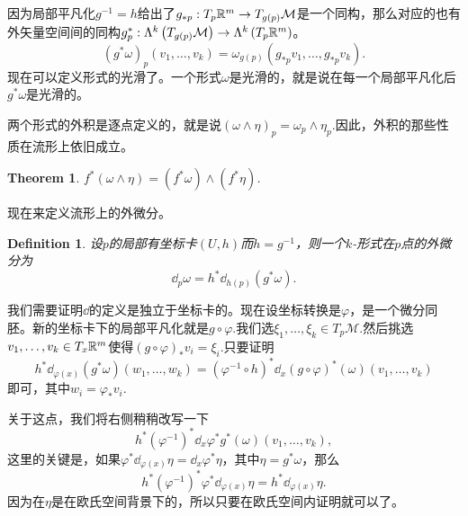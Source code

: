 \documentclass[11pt]{extbook}
\theoremstyle{plain}%
\newtheorem{theo}{Theorem}[section]%
\newtheorem{defi}{Definition}[section]%
\begin{document}
因为局部平凡化$g^{-1}=h$给出了$g_{*p}:T_{p}\mathbb{R}^m\to T_{g(p)}\mathcal{M}$是一个同构，那么对应的也有外矢量空间间的同构$g^*_p:\Lambda^k\left(T_{g(p)}\mathcal{M}\right)\to \Lambda^k\left(T_{p}\mathbb{R}^m\right)$。
\[
	(g^*\omega)_p(v_1,\dots,v_k)=\omega_{g(p)}\left(g_{*p}v_1,\dots,g_{*p}v_k\right).
\]
现在可以定义形式的光滑了。一个形式$\omega$是光滑的，就是说在每一个局部平凡化后$g^*\omega$是光滑的。

两个形式的外积是逐点定义的，就是说$(\omega\wedge\eta)_p=\omega_p\wedge\eta_p$.因此，外积的那些性质在流形上依旧成立。
\begin{theo}
$f^*(\omega\wedge\eta)=(f^*\omega)\wedge(f^*\eta)$.
\end{theo}
现在来定义流形上的外微分。
\begin{defi}
设$p$的局部有坐标卡$(U,h)$而$h=g^{-1}$，则一个$k$-形式在$p$点的外微分为
\[
	\dd_p\omega=h^* \dd_{h(p)}\left(g^*\omega\right).
\]
\end{defi}
我们需要证明$\dd$的定义是独立于坐标卡的。现在设坐标转换是$\varphi$，是一个微分同胚。新的坐标卡下的局部平凡化就是$g\circ \varphi$.我们选$\xi_1,\dots,\xi_k \in T_p\mathcal{M}$.然后挑选$v_1,\dots,v_k \in T_x\mathbb{R}^m$使得$(g\circ \varphi)_*v_i=\xi_i$.只要证明
\[
h^* \dd_{\varphi(x)}(g^*\omega)(w_1,\dots,w_k)=\left(\varphi^{-1}\circ h\right)^*\dd_{x}(g\circ \varphi)^*(\omega)(v_1,\dots,v_k)
\]
即可，其中$w_i=\varphi_*v_i$.

关于这点，我们将右侧稍稍改写一下
\[
h^*\left(\varphi^{-1}\right)^*\dd_{x}\varphi^*g^*(\omega)(v_1,\dots,v_k),
\]
这里的关键是，如果$\varphi^* \dd_{\varphi(x)} \eta=\dd _x\varphi^* \eta$，其中$\eta=g^*\omega$，那么
\[
h^*\left(\varphi^{-1}\right)^*\varphi^*\dd_{\varphi(x)}\eta=h^*\dd_{\varphi(x)}\eta.
\]
因为在$\eta$是在欧氏空间背景下的，所以只要在欧氏空间内证明就可以了。
\end{document}
